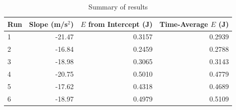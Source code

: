 \begin{table}[ht]
    \centering
    \begin{tabular}{|l|r|r|r|}
        \hline
        Run & Slope (m/s$^{2}$) & $E$ from Intercept (J) & Time-Average $E$ (J) \\
        \hline
        1 & -21.47 & 0.3157 & 0.2939 \\
        2 & -16.84 & 0.2459 & 0.2788 \\
        3 & -18.98 & 0.3065 & 0.3143 \\
        4 & -20.75 & 0.5010 & 0.4779 \\
        5 & -17.62 & 0.4318 & 0.4689 \\
        6 & -18.97 & 0.4979 & 0.5109 \\
        \hline
    \end{tabular}
    \caption{Summary of results}
    \label{table.07.results}
\end{table}
\FloatBarrier
\newpage
